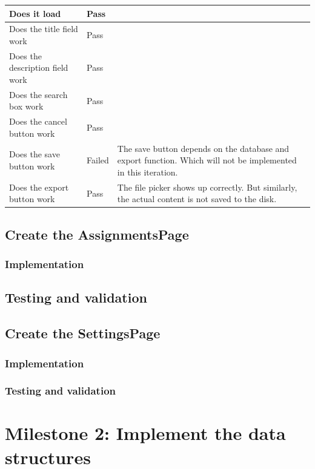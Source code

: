 \documentclass[a4paper]{report}
\begin{document}
\begin{tabulary}{\linewidth}{|L|l|L|}
    \hline
    Does it load & Pass & \\
    \hline
    Does the title field work & Pass & \\
    \hline
    Does the description field work & Pass & \\
    \hline
    Does the search box work & Pass & \\
    \hline
    Does the cancel button work & Pass & \\
    \hline
    Does the save button work & Failed & The save button depends on the database and export function. Which will not be implemented in this iteration. \\
    \hline
    Does the export button work & Pass & The file picker shows up correctly. But similarly, the actual content is not saved to the disk. \\
    \hline
\end{tabulary}

\subsection{Create the AssignmentsPage}

\subsubsection{Implementation}

\subsection{Testing and validation}

\subsection{Create the SettingsPage}

\subsubsection{Implementation}

\subsubsection{Testing and validation}

\section{Milestone 2: Implement the data structures}
\end{document}
